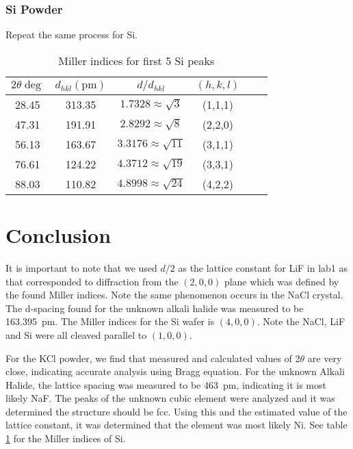 \documentclass[letterpaper,12pt]{article}
\begin{document}
\subsubsection{Si Powder}
Repeat the same process for Si.
\begin{table}[H]
  \centering
  \begin{tabular}{c|c|c|c|c|c}
    $2\theta\deg$ & $d_{hkl}(\si{\pico\meter})$ & $d/d_{hkl}$ & $(h,k,l)$\\ \hline
    28.45 & 313.35 & $1.7328\approx\sqrt{3}$  & (1,1,1) \\
    47.31 & 191.91 & $2.8292\approx\sqrt{8}$  & (2,2,0) \\
    56.13 & 163.67 & $3.3176\approx\sqrt{11}$ & (3,1,1) \\
    76.61 & 124.22 & $4.3712\approx\sqrt{19}$ & (3,3,1) \\
    88.03 & 110.82 & $4.8998\approx\sqrt{24}$ & (4,2,2) 
  \end{tabular}
  \caption{Miller indices for first 5 Si peaks}
  \label{tab:2}
\end{table}\newpage
\section{Conclusion}
It is important to note that we used $d/2$ as the lattice constant for LiF in lab1 as that corresponded to diffraction from the $(2,0,0)$ plane which was defined by the found Miller indices. Note the same phenomenon occurs in the NaCl crystal. The d-spacing found for the unknown alkali halide was measured to be \SI{163.395}{\pico\meter}. The Miller indices for the Si wafer is $(4,0,0)$. Note the NaCl, LiF and Si were all cleaved parallel to $(1,0,0)$.

For the KCl powder, we find that measured and calculated values of $2\theta$ are very close, indicating accurate analysis using Bragg equation. For the unknown Alkali Halide, the lattice spacing was measured to be \SI{463}{\pico\meter}, indicating it is most likely NaF. The peaks of the unknown cubic element were analyzed and it was determined the structure should be fcc. Using this and the estimated value of the lattice constant, it was determined that the element was most likely Ni. See table \ref{tab:2} for the Miller indices of Si. 


\end{document}
